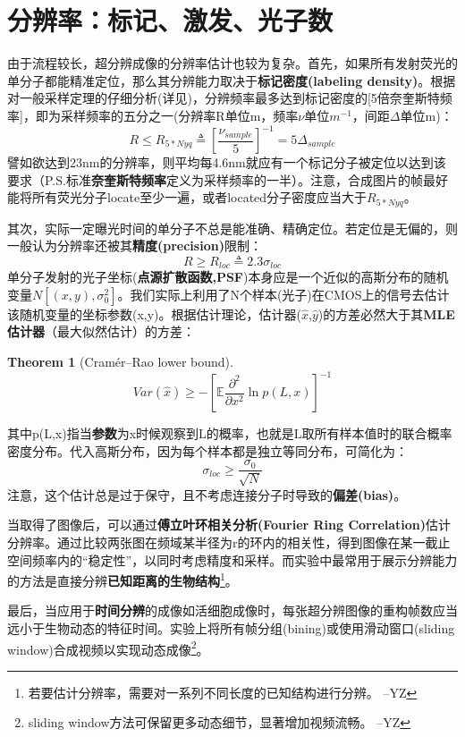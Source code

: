 \documentclass[12pt]{ctexart}
\newtheorem{theorem}{Theorem}
\begin{document}
\section*{分辨率：标记、激发、光子数}
由于流程较长，超分辨成像的分辨率估计也较为复杂。首先，如果所有发射荧光的单分子都能精准定位，那么其分辨能力取决于\textbf{标记密度(labeling density)}。根据对一般采样定理的仔细分析(详见\cite{legantHighdensityThreedimensionalLocalization2016})，分辨频率最多达到标记密度的[5倍奈奎斯特频率]，即为采样频率的五分之一(分辨率R单位m，频率$\nu$单位$m^{-1}$，间距$\Delta$单位m)：
\begin{equation}
    R\leq R_{5*Nyq}\triangleq[\frac{\nu_{sample}}{5}]^{-1}=5\Delta_{sample} 
\end{equation}
譬如欲达到23nm的分辨率，则平均每4.6nm就应有一个标记分子被定位以达到该要求（P.S.标准\textbf{奈奎斯特频率}定义为采样频率的一半）。注意，合成图片的帧最好能将所有荧光分子locate至少一遍，或者located分子密度应当大于$R_{5*Nyq}$。
\par 其次，实际一定曝光时间的单分子不总是能准确、精确定位。若定位是无偏的，则一般认为分辨率还被其\textbf{精度(precision)}限制：
\begin{equation}\label{CRLB}
    R\geq R_{loc}\triangleq2.3\sigma_{loc}
\end{equation}
单分子发射的光子坐标(\textbf{点源扩散函数,PSF})本身应是一个近似的高斯分布的随机变量$N[(x,y),\sigma_0^2]$。我们实际上利用了N个样本(光子)在CMOS上的信号去估计该随机变量的坐标参数(x,y)。根据估计理论，估计器($\hat{x}$,$\hat{y}$)的方差必然大于其\textbf{MLE估计器}（最大似然估计）的方差：
\begin{theorem}[Cramér–Rao lower bound]
    \[Var(\hat{x})\geq-[\mathbb{E}\frac{\partial^2}{\partial x^2}\ln{p(L,x)}]^{-1}\]
\end{theorem}
其中p(L,x)指当\textbf{参数}为x时候观察到L的概率，也就是L取所有样本值时的联合概率密度分布。代入高斯分布，因为每个样本都是独立等同分布，可简化为：
\begin{equation}
    \sigma_{loc}\geq \frac{\sigma_0}{\sqrt{N}}
\end{equation}
注意，这个估计总是过于保守，且不考虑连接分子时导致的\textbf{偏差(bias)}。
\par 当取得了图像后，可以通过\textbf{傅立叶环相关分析(Fourier Ring Correlation)}估计分辨率。通过比较两张图在频域某半径为r的环内的相关性，得到图像在某一截止空间频率内的“稳定性”，以同时考虑精度和采样。而实验中最常用于展示分辨能力的方法是直接分辨\textbf{已知距离的生物结构}\footnote{若要估计分辨率，需要对一系列不同长度的已知结构进行分辨。 --YZ}。
\par 最后，当应用于\textbf{时间分辨}的成像如活细胞成像时，每张超分辨图像的重构帧数应当远小于生物动态的特征时间。实验上将所有帧分组(bining)或使用滑动窗口(sliding window)合成视频以实现动态成像\footnote{sliding window方法可保留更多动态细节，显著增加视频流畅。 --YZ}。
\end{document}
